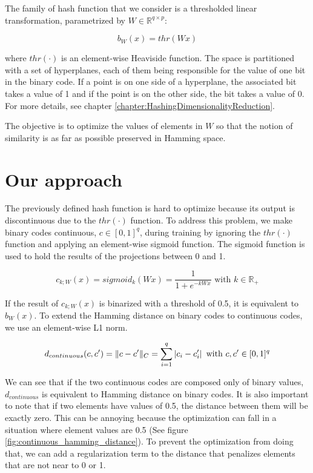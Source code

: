 The family of hash function that we consider is a thresholded linear transformation, parametrized by $W \in \mathbb{R}^{q \times p}$:

\[b_{W}(x) = thr(Wx)\]

where $thr(\cdot)$ is an element-wise Heaviside function. The space is partitioned with a set of hyperplanes, each of them being responsible for the value of one bit in the binary code. If a point is on one side of a hyperplane, the associated bit takes a value of 1 and if the point is on the other side, the bit takes a value of 0. For more details, see chapter \ref{chapter:HashingDimensionalityReduction}.

The objective is to optimize the values of elements in $W$ so that the notion of similarity is as far as possible preserved in Hamming space.

\section{Our approach}
The previously defined hash function is hard to optimize because its output is discontinuous due to the $thr(\cdot)$ function. To address this problem, we make binary codes continuous, $c \in [0, 1]^{q}$, during training by ignoring the $thr(\cdot)$ function and applying an element-wise sigmoid function. The sigmoid function is used to hold the results of the projections between 0 and 1.

\[c_{k;W}(x) = sigmoid_k(Wx) = \frac{1}{1 + e^{-kWx}} \text{ with } k \in \mathbb{R}_+\]

If the result of $c_{k;W}(x)$ is binarized with a threshold of 0.5, it is equivalent to $b_{W}(x)$. To extend the Hamming distance on binary codes to continuous codes, we use an element-wise L1 norm.

\[d_{continuous}(c, c') = \lVert c - c'\rVert_{C} = \sum\limits_{i=1}^q \left|c_i-c'_i\right| \text{ with } c, c' \in [0, 1]^{q}\]

We can see that if the two continuous codes are composed only of binary values, $d_{continuous}$ is equivalent to Hamming distance on binary codes. It is also important to note that if two elements have values of 0.5, the distance between them will be exactly zero. This can be annoying because the optimization can fall in a situation where element values are 0.5 (See figure \ref{fig:continuous_hamming_distance}). To prevent the optimization from doing that, we can add a regularization term to the distance that penalizes elements that are not near to 0 or 1.

